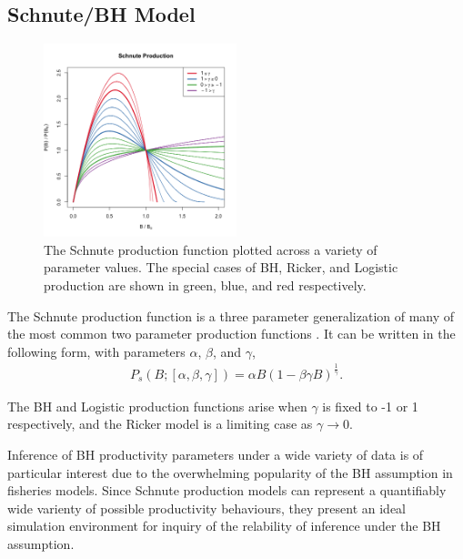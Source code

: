 \documentclass[12pt]{article}
\begin{document}
%
\clearpage
\subsection{Schnute/BH Model}

%
\begin{figure}
\vspace{-2cm}
\includegraphics[width=0.5\textwidth]{../gpBias/g3.png}
\vspace{-1cm}
\caption{
The Schnute production function plotted across a variety of parameter
values. The special cases of BH, Ricker, and Logistic production are shown in
green, blue, and red respectively.
}
\end{figure}
The Schnute production function is a three parameter generalization of many of 
the most common two parameter production functions . %
It can be written in the following form, with parameters $\alpha$, $\beta$, and $\gamma$,
%
\begin{align}
P_s(B; [\alpha, \beta, \gamma]) = \alpha B (1-\beta\gamma B)^{\frac{1}{\gamma}}.
\end{align}

%
The BH and Logistic production functions arise when $\gamma$ is fixed to -1 or 
1 respectively, and the Ricker model is a limiting case as $\gamma\rightarrow0$. %

% 
Inference of BH productivity parameters under a wide variety of data is of particular 
interest due to the overwhelming popularity of the BH assumption in fisheries 
models. Since Schnute production models can represent a quantifiably wide varienty 
of possible productivity behaviours, they present an ideal simulation 
environment for inquiry of the relability of inference under the BH 
assumption.
\end{document}
